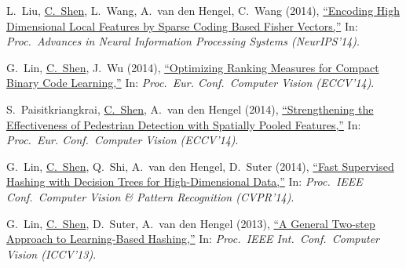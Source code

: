 \documentclass[9pt, a4paper]{article}
\newcommand{\years}[1]{\marginnote{\scriptsize #1}}
\def\highlight{\uline}
\begin{document}
\medskip

\years{2014} L.~Liu, \highlight{C.~Shen}, L.~Wang, A.~van den Hengel, C.~Wang (2014),
\href{http://www.google.com/search?lr=&ie=UTF-8&oe=UTF-8&q=Encoding+High+Dimensional+Local+Features+by+Sparse+Coding+Based+Fisher+Vectors+Lingqiao+Liu%2C+Chunhua+Shen%2C+Lei+Wang%2C+Anton+van+den+Hengel%2C+Chao+Wang}{``Encoding High Dimensional Local Features by Sparse Coding Based {F}isher Vectors,{}''}
In: \emph{Proc.\ Advances in Neural Information Processing Systems (NeurIPS'14)}.

\medskip

\years{2014} G.~Lin, \highlight{C.~Shen}, J.~Wu (2014),
\href{http://www.google.com/search?lr=&ie=UTF-8&oe=UTF-8&q=Optimizing+Ranking+Measures+for+Compact+Binary+Code+Learning+Guosheng+Lin%2C+Chunhua+Shen%2C+Jianxin+Wu}{``Optimizing Ranking Measures for Compact Binary Code Learning,{}''}
In: \emph{Proc.\ Eur. Conf.\  Computer Vision (ECCV'14)}.

\medskip

\years{2014} S.~Paisitkriangkrai, \highlight{C.~Shen}, A.~van den Hengel (2014),
\href{http://www.google.com/search?lr=&ie=UTF-8&oe=UTF-8&q=Strengthening+the+Effectiveness+of+Pedestrian+Detection+with+Spatially+Pooled+Features+Sakrapee+Paisitkriangkrai%2C+Chunhua+Shen%2C+Anton+van+den+Hengel}{``Strengthening the Effectiveness of Pedestrian Detection with Spatially Pooled Features,{}''}
In: \emph{Proc.\ Eur. Conf.\  Computer Vision (ECCV'14)}.

\medskip

\years{2014} G.~Lin, \highlight{C.~Shen}, Q.~Shi, A.~van den Hengel, D.~Suter (2014),
\href{http://www.google.com/search?lr=&ie=UTF-8&oe=UTF-8&q=Fast+Supervised+Hashing+with+Decision+Trees+for+High-Dimensional+Data+Guosheng+Lin%2C+Chunhua+Shen%2C+Qinfeng+Shi%2C+Anton+van+den+Hengel%2C+David+Suter}{``Fast Supervised Hashing with Decision Trees for High-Dimensional Data,{}''}
In: \emph{Proc.\ IEEE Conf.\  Computer Vision \& Pattern Recognition (CVPR'14)}.

\medskip

\years{2013} G.~Lin, \highlight{C.~Shen}, D.~Suter, A.~van den Hengel (2013),
\href{http://www.google.com/search?lr=&ie=UTF-8&oe=UTF-8&q=A+General+Two-step+Approach+to+Learning-Based+Hashing+Guosheng+Lin%2C+Chunhua+Shen%2C+David+Suter%2C+Anton+van+den+Hengel}{``A General Two-step Approach to Learning-Based Hashing,{}''}
In: \emph{Proc.\ IEEE Int.\ Conf.\  Computer Vision (ICCV'13)}.

\medskip
\end{document}
